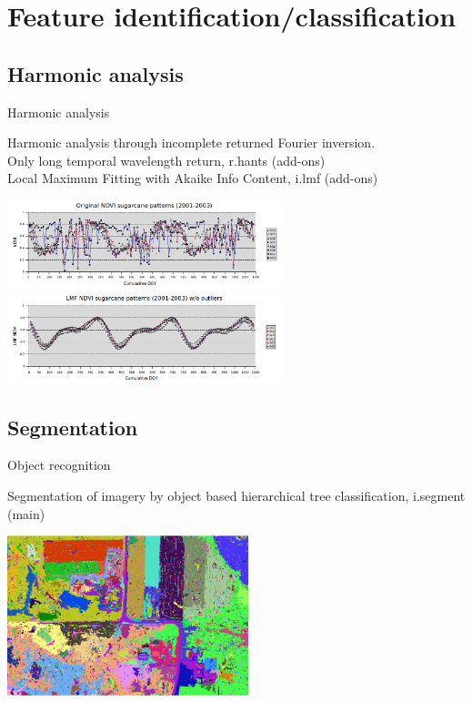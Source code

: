 \documentclass[xcolor=dvipsnames,beamer]{beamer} %
\begin{document}
\section{Feature identification/classification}
\subsection{Harmonic analysis}
\begin{frame}[fragile]{Harmonic analysis}

Harmonic analysis through incomplete returned Fourier inversion.\\
Only long temporal wavelength return, r.hants (add-ons)\\
Local Maximum Fitting with Akaike Info Content, i.lmf (add-ons)\\

\begin{center}
 \includegraphics[width=8cm]{hants0}
 \hspace{10mm}
 \includegraphics[width=8cm]{hants1}
\end{center}

\end{frame}

\subsection{Segmentation}
\begin{frame}[fragile]{Object recognition}

Segmentation of imagery by object based hierarchical tree classification, i.segment (main)

\begin{center}
 \includegraphics[width=7cm]{i_segment}
\end{center}

\end{frame}
\end{document}
